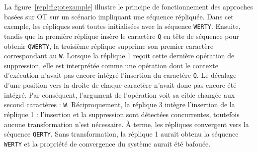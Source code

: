La figure~\ref{repl:fig:otexample} illustre le principe de fonctionnement des
approches basées sur OT sur un scénario impliquant une séquence répliquée. Dans
cet exemple, les répliques sont toutes initialisées avec la séquence
\texttt{WERTY}. Ensuite, tandis que la première réplique insère le caractère
\texttt{Q} en tête de séquence pour obtenir \texttt{QWERTY}, la troisième
réplique supprime son premier caractère correspondant au \texttt{W}. Lorsque la
réplique 1 reçoit cette dernière opération de suppression, elle est interprétée
comme une opération dont le contexte d'exécution n'avait pas encore intégré
l'insertion du caractère \texttt{Q}. Le décalage d'une position vers la droite
de chaque caractère n'avait donc pas encore été intégré. Par conséquent,
l'argument de l'opération voit sa cible changée aux second caractères :
\texttt{W}.  Réciproquement, la réplique 3 intègre l'insertion de la réplique 1
: l'insertion et la suppression sont détectées concurrentes, toutefois aucune
transformation n'est nécessaire. À terme, les répliques convergent vers la
séquence \texttt{QERTY}. Sans transformation, la réplique 1 aurait obtenu la
séquence \texttt{WERTY} et la propriété de convergence du système aurait été
bafouée.


